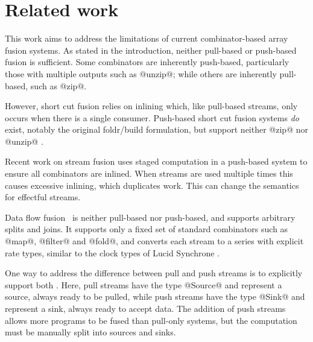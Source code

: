 \eject
\section{Related work}

This work aims to address the limitations of current combinator-based array fusion systems. As stated in the introduction, neither pull-based or push-based fusion is sufficient. Some combinators are inherently push-based, particularly those with multiple outputs such as @unzip@; while others are inherently pull-based, such as @zip@.


However, short cut fusion \cite{gill1993short} relies on inlining which, like pull-based streams, only occurs when there is a single consumer. Push-based short cut fusion systems \emph{do} exist, notably the original foldr/build formulation, but support neither @zip@ nor @unzip@ \cite{svenningsson2002shortcut,lippmeier2013data}.

Recent work on stream fusion \cite{kiselyov2016stream} uses staged computation in a push-based system to ensure all combinators are inlined. When streams are used multiple times this causes excessive inlining, which duplicates work. This can change the semantics for effectful streams.


Data flow fusion~\cite{lippmeier2013data} is neither pull-based nor push-based, and supports arbitrary splits and joins. It supports only a fixed set of standard combinators such as @map@, @filter@ and @fold@, and converts each stream to a series with explicit rate types, similar to the clock types of Lucid Synchrone \cite{benveniste2003synchronous}.

One way to address the difference between pull and push streams is to explicitly support both \cite{bernardy2015duality, lippmeier2016polarized}. Here, pull streams have the type @Source@ and represent a source, always ready to be pulled, while push streams have the type @Sink@ and represent a sink, always ready to accept data. The addition of push streams allows more programs to be fused than pull-only systems, but the computation must be manually split into sources and sinks.

